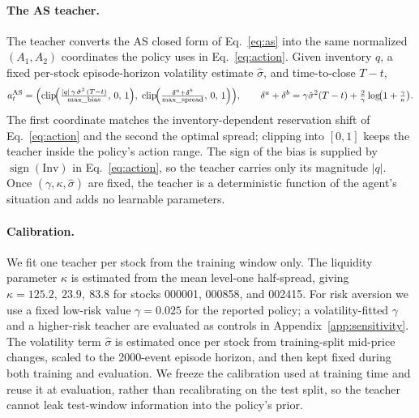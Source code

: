 \documentclass{article}
\begin{document}
\paragraph{The AS teacher.}
The teacher converts the AS closed form of Eq.~\eqref{eq:as} into the same normalized $(A_1,A_2)$ coordinates the policy uses in Eq.~\eqref{eq:action}. Given inventory $q$, a fixed per-stock episode-horizon volatility estimate $\hat\sigma$, and time-to-close $T-t$,
\begin{equation}
a^{\mathrm{AS}}_t
= \Bigl(
\operatorname{clip}\!\Bigl(\tfrac{|q|\,\gamma\,\hat\sigma^2\,(T-t)}{\text{max\_bias}},\,0,\,1\Bigr),\;
\operatorname{clip}\!\Bigl(\tfrac{\delta^a+\delta^b}{\text{max\_spread}},\,0,\,1\Bigr)
\Bigr),
\qquad
\delta^a+\delta^b = \gamma\hat\sigma^2(T-t) + \tfrac{2}{\gamma}\log\!\bigl(1+\tfrac{\gamma}{\kappa}\bigr).
\label{eq:teacher}
\end{equation}
The first coordinate matches the inventory-dependent reservation shift of Eq.~\eqref{eq:action} and the second the optimal spread; clipping into $[0,1]$ keeps the teacher inside the policy's action range. The sign of the bias is supplied by $\operatorname{sign}(\mathrm{Inv})$ in Eq.~\eqref{eq:action}, so the teacher carries only its magnitude $|q|$. Once $(\gamma,\kappa,\hat\sigma)$ are fixed, the teacher is a deterministic function of the agent's situation and adds no learnable parameters.

\paragraph{Calibration.}
We fit one teacher per stock from the training window only. The liquidity parameter $\kappa$ is estimated from the mean level-one half-spread, giving $\kappa = 125.2,\ 23.9,\ 83.8$ for stocks 000001, 000858, and 002415. For risk aversion we use a fixed low-risk value $\gamma = 0.025$ for the reported policy; a volatility-fitted $\gamma$ and a higher-risk teacher are evaluated as controls in Appendix~\ref{app:sensitivity}. The volatility term $\hat\sigma$ is estimated once per stock from training-split mid-price changes, scaled to the 2000-event episode horizon, and then kept fixed during both training and evaluation. We freeze the calibration used at training time and reuse it at evaluation, rather than recalibrating on the test split, so the teacher cannot leak test-window information into the policy's prior.
\end{document}

